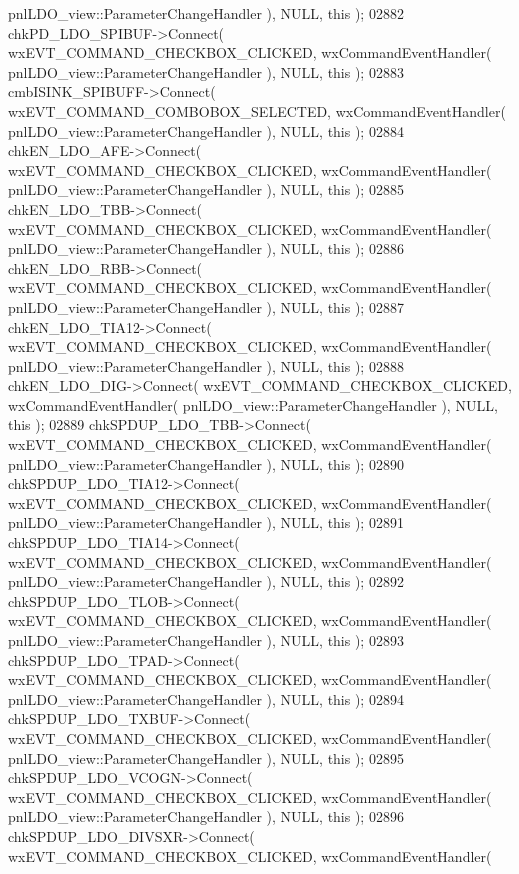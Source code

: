 \begin{DoxyCode}
      pnlLDO_view::ParameterChangeHandler ), NULL, \textcolor{keyword}{this} );
02882     chkPD_LDO_SPIBUF->Connect( wxEVT\_COMMAND\_CHECKBOX\_CLICKED, wxCommandEventHandler( 
      pnlLDO_view::ParameterChangeHandler ), NULL, \textcolor{keyword}{this} );
02883     cmbISINK_SPIBUFF->Connect( wxEVT\_COMMAND\_COMBOBOX\_SELECTED, wxCommandEventHandler( 
      pnlLDO_view::ParameterChangeHandler ), NULL, \textcolor{keyword}{this} );
02884     chkEN_LDO_AFE->Connect( wxEVT\_COMMAND\_CHECKBOX\_CLICKED, wxCommandEventHandler( 
      pnlLDO_view::ParameterChangeHandler ), NULL, \textcolor{keyword}{this} );
02885     chkEN_LDO_TBB->Connect( wxEVT\_COMMAND\_CHECKBOX\_CLICKED, wxCommandEventHandler( 
      pnlLDO_view::ParameterChangeHandler ), NULL, \textcolor{keyword}{this} );
02886     chkEN_LDO_RBB->Connect( wxEVT\_COMMAND\_CHECKBOX\_CLICKED, wxCommandEventHandler( 
      pnlLDO_view::ParameterChangeHandler ), NULL, \textcolor{keyword}{this} );
02887     chkEN_LDO_TIA12->Connect( wxEVT\_COMMAND\_CHECKBOX\_CLICKED, wxCommandEventHandler( 
      pnlLDO_view::ParameterChangeHandler ), NULL, \textcolor{keyword}{this} );
02888     chkEN_LDO_DIG->Connect( wxEVT\_COMMAND\_CHECKBOX\_CLICKED, wxCommandEventHandler( 
      pnlLDO_view::ParameterChangeHandler ), NULL, \textcolor{keyword}{this} );
02889     chkSPDUP_LDO_TBB->Connect( wxEVT\_COMMAND\_CHECKBOX\_CLICKED, wxCommandEventHandler( 
      pnlLDO_view::ParameterChangeHandler ), NULL, \textcolor{keyword}{this} );
02890     chkSPDUP_LDO_TIA12->Connect( wxEVT\_COMMAND\_CHECKBOX\_CLICKED, wxCommandEventHandler( 
      pnlLDO_view::ParameterChangeHandler ), NULL, \textcolor{keyword}{this} );
02891     chkSPDUP_LDO_TIA14->Connect( wxEVT\_COMMAND\_CHECKBOX\_CLICKED, wxCommandEventHandler( 
      pnlLDO_view::ParameterChangeHandler ), NULL, \textcolor{keyword}{this} );
02892     chkSPDUP_LDO_TLOB->Connect( wxEVT\_COMMAND\_CHECKBOX\_CLICKED, wxCommandEventHandler( 
      pnlLDO_view::ParameterChangeHandler ), NULL, \textcolor{keyword}{this} );
02893     chkSPDUP_LDO_TPAD->Connect( wxEVT\_COMMAND\_CHECKBOX\_CLICKED, wxCommandEventHandler( 
      pnlLDO_view::ParameterChangeHandler ), NULL, \textcolor{keyword}{this} );
02894     chkSPDUP_LDO_TXBUF->Connect( wxEVT\_COMMAND\_CHECKBOX\_CLICKED, wxCommandEventHandler( 
      pnlLDO_view::ParameterChangeHandler ), NULL, \textcolor{keyword}{this} );
02895     chkSPDUP_LDO_VCOGN->Connect( wxEVT\_COMMAND\_CHECKBOX\_CLICKED, wxCommandEventHandler( 
      pnlLDO_view::ParameterChangeHandler ), NULL, \textcolor{keyword}{this} );
02896     chkSPDUP_LDO_DIVSXR->Connect( wxEVT\_COMMAND\_CHECKBOX\_CLICKED, wxCommandEventHandler( 

\end{DoxyCode}
